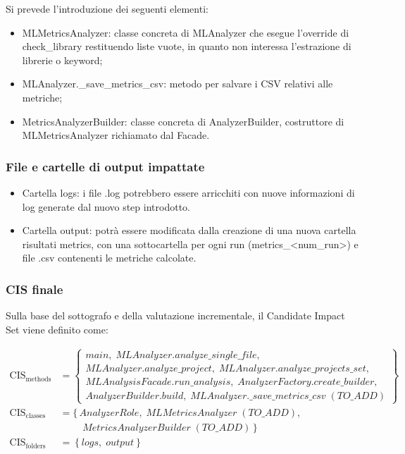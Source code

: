\documentclass[11pt,a4paper]{article}
\makeatletter
\newif\ifmark@prevlower
\def\mark@casebreak#1{%
  \ifcat\noexpand#1\relax
    \mark@prevlowerfalse
  \else
    \ifnum`#1=\uccode`#1\relax
      \ifmark@prevlower\allowbreak\fi
      \mark@prevlowerfalse
    \else
      \ifnum`#1=\lccode`#1\relax
        \mark@prevlowertrue
      \else
        \mark@prevlowerfalse
      \fi
    \fi
  \fi}
\def\mark@brk#1{%
  \ifx#1\mark@stop
    \let\mark@next\relax
  \else
    \mark@casebreak{#1}%
    #1%
    \ifx#1.\allowbreak\else
      \ifx#1\_\allowbreak\else
        \ifx#1/\allowbreak\else
          \ifx#1(\allowbreak\fi
        \fi
      \fi
    \fi
    \let\mark@next\mark@brk
  \fi
  \mark@next}
\def\mark@stop{\mark@stop}
\DeclareRobustCommand{\mark@code}[1]{%
  \ifmmode
    \text{\ttfamily\small\mark@prevlowerfalse\mark@brk#1\mark@stop}%
  \else
    {\ttfamily\small\mark@prevlowerfalse\mark@brk#1\mark@stop}%
  \fi}
\DeclareRobustCommand{\cls}[1]{\mark@code{#1}}
\DeclareRobustCommand{\meth}[1]{\mark@code{#1}}
\DeclareRobustCommand{\pkgpath}[1]{\mark@code{#1}}
\DeclareRobustCommand{\file}[1]{\mark@code{#1}}
\def\mark@code#1{#1}%
\def\cls#1{#1}%
\def\meth#1{#1}%
\def\pkgpath#1{#1}%
\def\file#1{#1}%
\newcommand{\CIS}{\textrm{CIS}}
\makeatother
\begin{document}
Si prevede l'introduzione dei seguenti elementi:

\begin{itemize}[nosep]
  \item \cls{MLMetricsAnalyzer}: classe concreta di \cls{MLAnalyzer} che esegue
    l'override di \meth{check\_library} restituendo liste vuote, in quanto non
    interessa l'estrazione di librerie o keyword;
  \item \meth{MLAnalyzer.\_save\_metrics\_csv}: metodo per salvare i CSV
    relativi alle metriche;
  \item \cls{MetricsAnalyzerBuilder}: classe concreta di \cls{AnalyzerBuilder},
    costruttore di \cls{MLMetricsAnalyzer} richiamato dal Facade.
\end{itemize}

\subsubsection*{File e cartelle di output impattate}

\begin{itemize}[nosep]
  \item Cartella \pkgpath{logs}: i file \file{.log} potrebbero essere arricchiti
    con nuove informazioni di log generate dal nuovo step introdotto.
  \item Cartella \pkgpath{output}: potr\`a essere modificata dalla creazione di
    una nuova cartella risultati \pkgpath{metrics}, con una sottocartella per
    ogni run (\pkgpath{metrics\_<num\_run>}) e file \file{.csv} contenenti le
    metriche calcolate.
\end{itemize}

\subsubsection{CIS finale}
\label{sec:ia-cr1-cis-finale}

Sulla base del sottografo e della valutazione incrementale, il Candidate Impact
Set viene definito come:

\begin{align*}
  \CIS_{\text{methods}} &= \left\{
    \begin{array}{l}
      \meth{main},\;
      \meth{MLAnalyzer.analyze\_single\_file},\\
      \meth{MLAnalyzer.analyze\_project},\;
      \meth{MLAnalyzer.analyze\_projects\_set},\\
      \meth{MLAnalysisFacade.run\_analysis},\;
      \meth{AnalyzerFactory.create\_builder},\\
      \meth{AnalyzerBuilder.build},\;
      \meth{MLAnalyzer.\_save\_metrics\_csv}\;(\textit{TO\_ADD})
    \end{array}
  \right\}\\[6pt]
  \CIS_{\text{classes}} &= \{\,
    \cls{AnalyzerRole},\;
    \cls{MLMetricsAnalyzer}\;(\textit{TO\_ADD}),\\
  &\phantom{{}={}}\quad
    \cls{MetricsAnalyzerBuilder}\;(\textit{TO\_ADD})\, \}\\[6pt]
  \CIS_{\text{folders}} &= \left\{ \pkgpath{logs},\; \pkgpath{output} \right\}
\end{align*}
\end{document}
